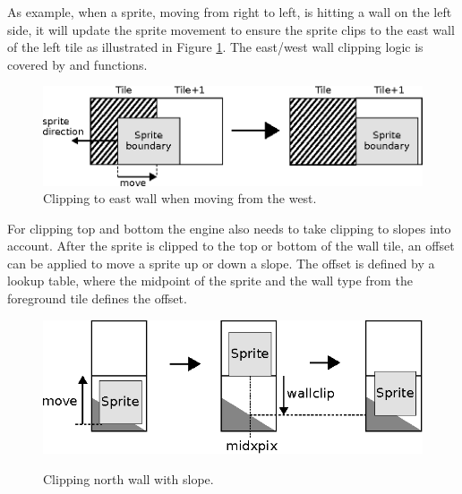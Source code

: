 \documentclass[book.tex]{subfiles}
\begin{document}
\par
As example, when a sprite, moving from right to left, is hitting a wall on the left side, it will update the sprite movement to ensure the sprite clips to the east wall of the left tile as illustrated in Figure \ref{fig:clipping_east}. The east/west wall clipping logic is covered by  and  functions. \\

\begin{figure}[H]
  \centering
  \includegraphics[width=\textwidth]{imgs/drawings/clipping_east.eps}
  \caption{Clipping to east wall when moving from the west.}
  \label{fig:clipping_east}  
\end{figure}

\par
\begin{minipage}{\textwidth}
  
\end{minipage}
\label{wallclip_array}
\par
For clipping top and bottom the engine also needs to take clipping to slopes into account. After the sprite is clipped to the top or bottom of the wall tile, an offset can be applied to move a sprite up or down a slope. The offset is defined by a lookup table, where the midpoint of the sprite and the wall type from the foreground tile defines the offset.

\begin{figure}[H]
  \centering
  \includegraphics[width=\textwidth]{imgs/drawings/clipping_north.eps}
  \label{fig:clipping_north}
  \caption{Clipping north wall with slope.}
\end{figure}
\end{document}
